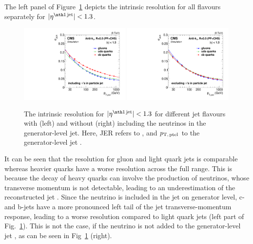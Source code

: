 The left panel of Figure~\ref{res:fig:ResolutionDifferences} depicts the intrinsic resolution for all flavours separately for $|\etafirstjet|<1.3$.
\begin{figure}[!b]
  \centering
      \includegraphics[width=0.49\textwidth]{figures/resolution/systematicUncertainties/Figure_38_withNu_Teresa_updated_4.pdf}
      \includegraphics[width=0.49\textwidth]{figures/resolution/systematicUncertainties/Figure_38_noNu_Teresa_updated_4.pdf}
  \caption{The intrinsic resolution \jerintr for $|\etafirstjet| < 1.3$ for different jet flavours with (left) and without (right) including the neutrinos in the generator-level jet.
           Here, JER refers to \jerintr, and $p_{\text{T,\,ptcl}}$ to the generator-level jet \pt. }  
  \label{res:fig:ResolutionDifferences}
\end{figure}
It can be seen that the resolution for gluon and light quark jets is comparable whereas heavier quarks have a worse resolution across the full \pt range.
This is because the decay of heavy quarks can involve the production of neutrinos, whose transverse momentum is not detectable, leading to an underestimation of the reconstructed jet \pt.
Since the neutrino \pt is included in the jet \pt on generator level, c- and b-jets have a more pronounced left tail of the jet transverse-momentum response, leading to a worse resolution compared to light quark jets (left part of Fig.~\ref{res:fig:ResolutionDifferences}). 
This is not the case, if the neutrino \pt is not added to the generator-level jet \pt, as can be seen in Fig~\ref{res:fig:ResolutionDifferences} (right).


